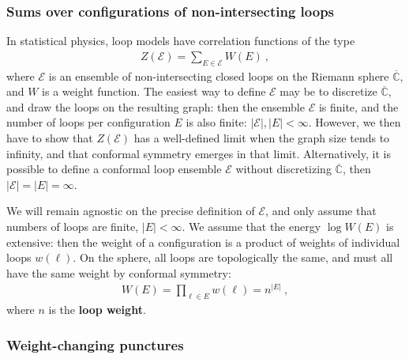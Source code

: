 \documentclass[12pt, a4paper]{article}
\theoremstyle{break}
\begin{document}
\subsubsection{Sums over configurations of non-intersecting loops}

In statistical physics, loop models have correlation functions of the type
\begin{align}
 Z(\mathcal{E}) = \sum_{E\in\mathcal{E}} W(E)\ , 
\end{align}
where $\mathcal{E}$ is an ensemble of non-intersecting closed loops on the Riemann sphere $\overline{\mathbb{C}}$, and $W$ is a weight function. The easiest way to define $\mathcal{E}$ may be to discretize $\overline{\mathbb{C}}$, and draw the loops on the resulting graph: then the ensemble $\mathcal{E}$ is finite, and the number of loops per configuration $E$ is also finite: $|\mathcal{E}|, |E|<\infty$. 
However, we then have to show that $Z(\mathcal{E})$ has a well-defined limit when the graph size tends to infinity, and that conformal symmetry emerges in that limit. Alternatively, it is possible to define a conformal loop ensemble $\mathcal{E}$ without discretizing $\overline{\mathbb{C}}$, then $|\mathcal{E}|=|E|=\infty$. 
 
We will remain agnostic on the precise definition of $\mathcal{E}$, and only assume that numbers of loops are finite, $|E|<\infty$. We assume that the energy $\log W(E)$ is extensive: then the weight of a configuration is a product of weights of individual loops $w(\ell)$. On the sphere, all loops are topologically the same, and must all have the same weight by conformal symmetry: 
\begin{align}
 W(E) = \prod_{\ell \in E } w(\ell) = n^{|E|}\ ,
\end{align}
where $n$ is the \textbf{loop weight}. 


\subsubsection{Weight-changing punctures}
\end{document}
